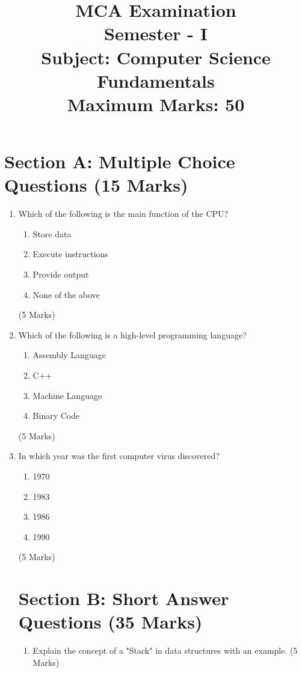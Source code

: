 \documentclass[a4paper,12pt]{article}
\title{MCA Examination\\
       Semester - I\\
       Subject: Computer Science Fundamentals\\
       Maximum Marks: 50}
\author{}
\date{}
\begin{document}
\maketitle

\section*{Section A: Multiple Choice Questions (15 Marks)}

\begin{enumerate}
    \item Which of the following is the main function of the CPU?
    \begin{enumerate}
        \item Store data
        \item Execute instructions
        \item Provide output
        \item None of the above
    \end{enumerate}
    (5 Marks)

    \item Which of the following is a high-level programming language?
    \begin{enumerate}
        \item Assembly Language
        \item C++
        \item Machine Language
        \item Binary Code
    \end{enumerate}
    (5 Marks)

    \item In which year was the first computer virus discovered?
    \begin{enumerate}
        \item 1970
        \item 1983
        \item 1986
        \item 1990
    \end{enumerate}
    (5 Marks)

   

\newpage 

\section*{Section B: Short Answer Questions (35 Marks)}

\begin{enumerate}
    \item Explain the concept of a "Stack" in data structures with an example. (5 Marks)\\
    

\end{enumerate}
\end{enumerate}
\end{document}
